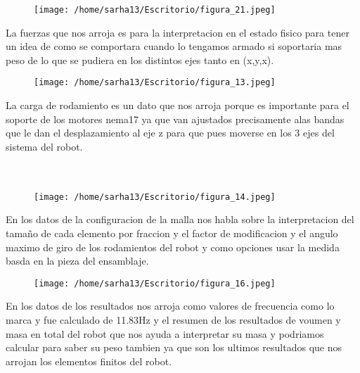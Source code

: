 \documentclass[letter,openright,12pt,spanish]{report}
\begin{document}
\begin{figure}[htp!]
\centering
\texttt{[image: /home/sarha13/Escritorio/figura\_21.jpeg]}
\caption{}
\label{Figura 7.}
\end{figure}

La fuerzas que nos arroja es para la interpretacion en el estado fisico para tener un idea de como se comportara cuando lo tengamos armado si soportaria mas peso de lo que se pudiera en los distintos ejes tanto en (x,y,x).

\begin{figure}[htp!]
\centering
\texttt{[image: /home/sarha13/Escritorio/figura\_13.jpeg]}
\caption{}
\label{Figura 7.}
\end{figure}

La carga de rodamiento es un dato que nos arroja porque es importante para el soporte de los motores nema17 ya que van ajustados precisamente alas bandas que le dan el desplazamiento al eje z para que pues moverse en los 3 ejes del sistema del robot.\\\\\\

\begin{figure}[htp!]
\centering
\texttt{[image: /home/sarha13/Escritorio/figura\_14.jpeg]}
\caption{}
\label{Figura 7.}
\end{figure}

En los datos de la configuracion de la malla nos habla sobre la interpretacion del tamaño de cada elemento por fraccion y el factor de modificacion y el angulo maximo de giro de los rodamientos del robot y como opciones usar la medida basda en la pieza del ensamblaje.

\begin{figure}[htp!]
\centering
\texttt{[image: /home/sarha13/Escritorio/figura\_16.jpeg]}
\caption{}
\label{Figura 7.}
\end{figure}

En los datos de los resultados nos arroja como valores de frecuencia como lo marca y fue calculado de 11.83Hz y el resumen de los resultados de voumen y masa en total del robot que nos ayuda a interpretar su masa y podriamos calcular para saber su peso tambien ya que son los ultimos resultados que nos arrojan los elementos finitos del robot.\\\\\\\\\\
\end{document}
